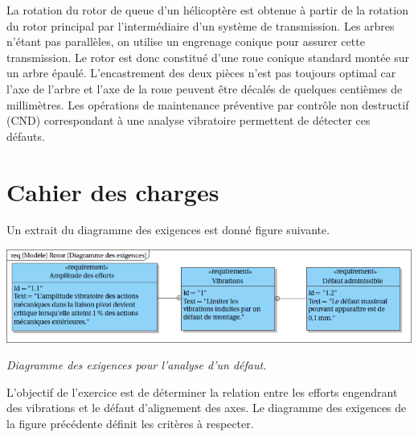 \documentclass[10pt,fleqn]{article} %
\begin{document}
\def\pathfig{images}

\vspace{4.5cm}
\pagestyle{fancy}
\thispagestyle{plain}

\def\columnseprulecolor{\color{ocre}}
\setlength{\columnseprule}{0.4pt} 

\def\pathfig{images}

\begin{multicols}{2}



La rotation du rotor de queue d'un hélicoptère est obtenue à partir de la rotation du rotor principal par l'intermédiaire d'un système de transmission. Les arbres n'étant pas parallèles, on utilise un engrenage conique pour assurer cette transmission. Le rotor est donc constitué d'une roue conique standard montée sur un arbre épaulé. L'encastrement des deux pièces n'est pas toujours optimal car l'axe de l'arbre et l'axe de la roue peuvent être décalés de quelques centièmes de millimètres. 
Les opérations de maintenance préventive par contrôle non destructif (CND) correspondant à une analyse vibratoire permettent de détecter ces défauts.

\section*{Cahier des charges}
Un extrait du diagramme des exigences est donné figure suivante.

\begin{center}
%
\includegraphics[width=\linewidth]{images/fig_01}

\textit{Diagramme des exigences pour l'analyse d'un défaut.}
\end{center}


\begin{obj}
L'objectif de l'exercice est de déterminer la relation entre les efforts engendrant des vibrations et le défaut d'alignement des axes. Le diagramme des exigences de la figure précédente%
définit les critères à respecter.
\end{obj}


\end{multicols}
\end{document}
